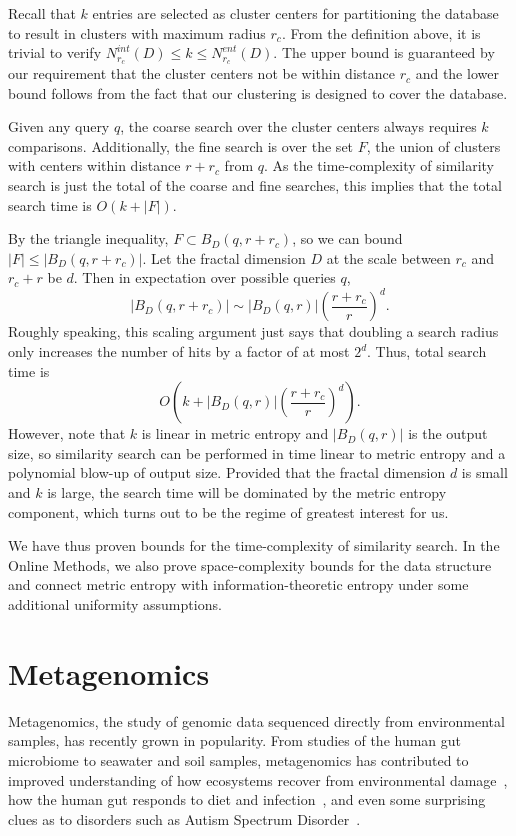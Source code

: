 \documentclass{amsbook}
\theoremstyle{definition}
\theoremstyle{remark}
\numberwithin{equation}{section}
\begin{document}
Recall that $k$ entries are selected as cluster centers for partitioning the database to result in clusters with maximum radius $r_c$.
From the definition above, it is trivial to verify $ N_{r_c}^{int}(D) \le k \le N_{r_c}^{ent} (D)$.
The upper bound is guaranteed by our requirement that the cluster centers not be within distance $r_c$ and the lower bound follows from the fact that our clustering is designed to cover the database.

Given any query $q$, the coarse search over the cluster centers always requires $k$ comparisons.
Additionally, the fine search is over the set $F$, the union of clusters with centers within distance $r+r_c$ from $q$.
As the time-complexity of similarity search is just the total of the coarse and fine searches, this implies that the total search time is $O(k + |F|)$.

By the triangle inequality, $F \subset B_D(q,r+r_c)$,
so we can bound $|F| \le |B_D(q,r+r_c)|$.
Let the fractal dimension $D$ at the scale between $r_c$ and $r_c + r$ be $d$.
Then in expectation over possible queries $q$,
\[
    \left|B_D(q, r+r_c)\right| \sim \left|B_D(q,r)\right|\left(\frac{r+r_c}{r}\right)^d .
\]
Roughly speaking, this scaling argument just says that doubling a search radius only increases the number of hits by a factor of at most $2^d$.
Thus, total search time is 
\[
    O\left(k + \left|B_D(q,r)\right|\left(\frac{r+r_c}{r}\right)^d \right).
\]
However, note that $k$ is linear in metric entropy and $|B_D(q,r)|$ is the output size, so similarity search can be performed in time linear to metric entropy and a polynomial blow-up of output size.
Provided that the fractal dimension $d$ is small and $k$ is large, the search time will be dominated by the metric entropy component, which turns out to be the regime of greatest interest for us.

We have thus proven bounds for the time-complexity of similarity search.
In the Online Methods, we also prove space-complexity bounds for the data structure and connect metric entropy with information-theoretic entropy under some additional uniformity assumptions.

\section*{Metagenomics}

Metagenomics, the study of genomic data sequenced directly from environmental
samples, has recently grown in popularity.
From studies of the human gut microbiome to seawater and soil samples,
metagenomics has contributed to improved understanding of how ecosystems recover
from environmental damage~\cite{Tyson:2004}, how the human gut responds to 
diet
and infection~\cite{David:2014}, and even some surprising clues as to disorders 
such as Autism Spectrum Disorder~\cite{MacFabe:2012}.
\end{document}
